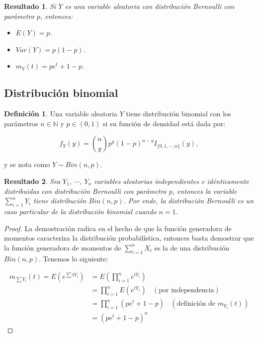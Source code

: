 \documentclass[
  10pt,
  spanish,
]{book}
\providecommand{\tightlist}{%
  \setlength{\itemsep}{0pt}\setlength{\parskip}{0pt}}
\newtheorem{proposition}{Resultado}[chapter]
\theoremstyle{definition}
\newtheorem{definition}{Definición}[chapter]
\theoremstyle{definition}
\theoremstyle{definition}
\theoremstyle{definition}
\theoremstyle{remark}
\begin{document}
\begin{proposition}
\protect\hypertarget{prp:unnamed-chunk-6}{}{\label{prp:unnamed-chunk-6} }Si \(Y\) es una variable aleatoria con distribución Bernoulli con parámetro \(p\), entonces:

\begin{itemize}
\tightlist
\item
  \(E(Y)=p\).
\item
  \(Var(Y)=p(1-p)\).
\item
  \(m_Y(t)=pe^t+1-p\).
\end{itemize}
\end{proposition}

\hypertarget{distribuciuxf3n-binomial}{%
\subsection{Distribución binomial}\label{distribuciuxf3n-binomial}}

\begin{definition}
\protect\hypertarget{def:unnamed-chunk-7}{}{\label{def:unnamed-chunk-7} }Una variable aleatoria \(Y\) tiene distribución binomial con los parámetros \(n\in \mathbb{N}\) y \(p\in (0,1)\) si su función de densidad está dada por:

\begin{equation}
f_Y(y)=\binom{n}{y}p^y(1-p)^{n-y}I_{\{0,1,\cdots,n\}}(y),
\end{equation}

y se nota como \(Y\sim Bin(n,p)\).
\end{definition}

\begin{proposition}
\protect\hypertarget{prp:unnamed-chunk-8}{}{\label{prp:unnamed-chunk-8} }Sea \(Y_1\), \(\cdots\), \(Y_n\) variables aleatorias independientes e idénticamente distribuidas con distribución Bernoulli con parámetro \(p\),
entonces la variable \(\sum_{i=1}^nY_i\) tiene distribución \(Bin(n,p)\). Por ende, la distribución Bernoulli es un caso particular de la distribución binomial cuando \(n=1\).
\end{proposition}

\begin{proof}
\iffalse{} {Prueba. } \fi{}La demostración radica en el hecho de que la función generadora de momentos caracteriza la distribución probabilística, entonces basta demostrar que la función generadora de momentos de \(\sum_{i=1}^nX_i\) es la de una distribución \(Bin(n,p)\). Tenemos lo siguiente:

\begin{align*}
m_{\sum Y_i}(t)=E(e^{\sum tY_i})&=E(\prod_{i=1}^ne^{tY_i})\\
               &=\prod_{i=1}^nE(e^{tY_i})\ \ \ \ (\text{por independencia})\\
               &=\prod_{i=1}^n(pe^t+1-p)\ \ \ \ (\text{definición de $m_{Y_i}(t)$})\\
               &=(pe^t+1-p)^n
\end{align*}
\end{proof}
\end{document}
